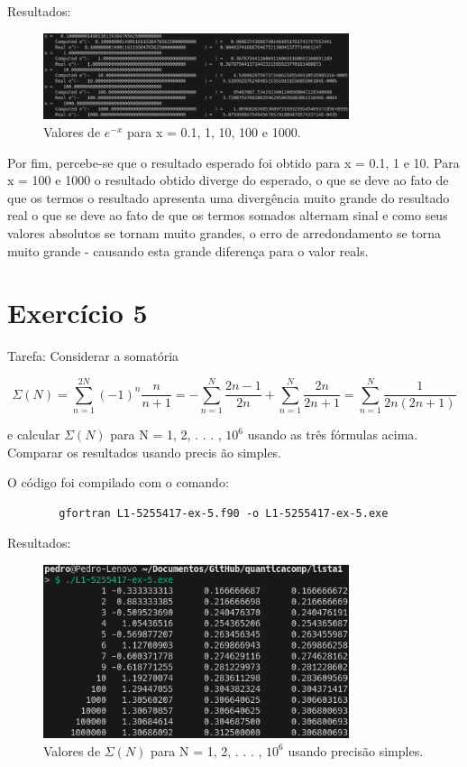 \documentclass[12pt, a4paper]{article} %
\begin{document}
    Resultados:
    \begin{figure}[H]
        \centering
        \includegraphics[width=0.8\textwidth]{../images/results-ex4.png}
        \caption{Valores de $e^{-x}$ para x = 0.1, 1, 10, 100 e 1000.}
    \end{figure}

    Por fim, percebe-se que o resultado esperado foi obtido para x = 0.1, 1 e 10. Para x = 100 e 1000 o resultado obtido diverge do esperado, o que se deve ao fato de que os termos o resultado apresenta uma diverg\^encia muito grande do resultado real o que se deve ao fato de que os termos somados alternam sinal e como seus valores absolutos se tornam muito grandes, o erro de arredondamento se torna muito grande - causando esta grande diferen\c{c}a para o valor reals.

\section{Exerc\'icio 5}

    Tarefa: Considerar a somat\'oria

    \begin{equation} \Sigma (N) = \sum_{n=1}^{2N} (-1)^n\frac{n}{n+1} = - \sum_{n=1}^N \frac{2n-1}{2n} + \sum_{n=1}^N \frac{2n}{2n+1} = \sum_{n=1}^N \frac{1}{2n(2n+1)} \end{equation}

    e calcular $\Sigma (N)$ para N = 1, 2, . . . , $10^6$ usando as tr\^es f\'ormulas acima. Comparar os resultados usando precis \~ao simples.


    O c\'odigo foi compilado com o comando:
    \begin{verbatim}
        gfortran L1-5255417-ex-5.f90 -o L1-5255417-ex-5.exe
    \end{verbatim}

    Resultados:
    \begin{figure}[H]
        \centering
        \includegraphics[width=0.8\textwidth]{../images/results-ex5.png}
        \caption{Valores de $\Sigma (N)$ para N = 1, 2, . . . , $10^6$ usando precis\~ao simples.}
    \end{figure}
\end{document}
